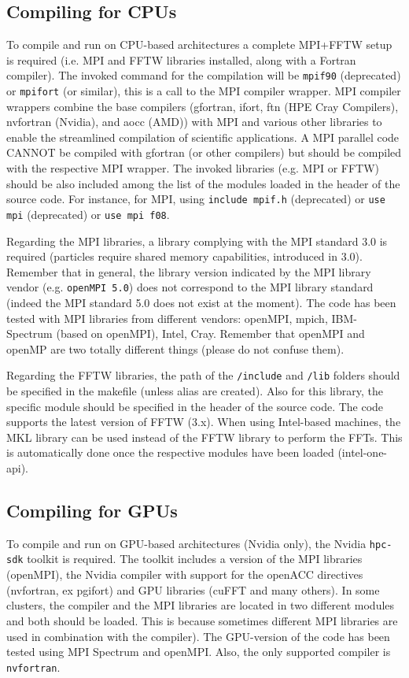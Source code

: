 \subsection{Compiling for CPUs}
To compile and run on CPU-based architectures a complete MPI+FFTW setup is required (i.e. MPI and FFTW libraries installed, along with a Fortran compiler).
The invoked command for the compilation will be \texttt{mpif90} (deprecated) or \texttt{mpifort} (or similar), this is a call to the MPI compiler wrapper.
MPI compiler wrappers combine the base compilers (gfortran, ifort, ftn (HPE Cray Compilers), nvfortran (Nvidia), and aocc (AMD)) with MPI and various other libraries to enable the streamlined compilation of scientific applications.
A MPI parallel code CANNOT be compiled with gfortran (or other compilers) but should be compiled with the respective MPI wrapper.
The invoked libraries (e.g. MPI or FFTW) should be also included among the list of the modules loaded in the header of the source code. 
For instance, for MPI, using \texttt{include mpif.h} (deprecated) or \texttt{use mpi} (deprecated) or \texttt{use mpi f08}.

Regarding the MPI libraries, a library complying with the MPI standard 3.0 is required (particles require shared memory capabilities, introduced in 3.0). 
Remember that in general, the library version indicated by the MPI library vendor (e.g. \texttt{openMPI 5.0}) does not correspond to the MPI library standard (indeed the MPI standard 5.0 does not exist at the moment).
The code has been tested with MPI libraries from different vendors: openMPI, mpich, IBM-Spectrum (based on openMPI), Intel, Cray.
Remember that openMPI and openMP are two totally different things (please do not confuse them).

Regarding the FFTW libraries, the path of the \texttt{/include} and \texttt{/lib} folders should be specified in the makefile (unless alias are created).
Also for this library, the specific module should be specified in the header of the source code.
The code supports the latest version of FFTW (3.x).
When using Intel-based machines, the MKL library can be used instead of the FFTW library to perform the FFTs.
This is automatically done once the respective modules have been loaded (intel-one-api).


\subsection{Compiling for GPUs}
To compile and run on GPU-based architectures (Nvidia only), the Nvidia \texttt{hpc-sdk} toolkit is required.
The toolkit includes a version of the MPI libraries (openMPI), the Nvidia compiler with support for the openACC directives (nvfortran, ex pgifort) and GPU libraries (cuFFT and many others).
In some clusters, the compiler and the MPI libraries are located in two different modules and both should be loaded.
This is because sometimes different MPI libraries are used in combination with the compiler). 
The GPU-version of the code has been tested using MPI Spectrum and openMPI.
Also, the only supported compiler is \texttt{nvfortran}.


